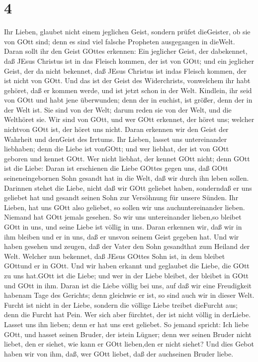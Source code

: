 \hypertarget{section-3}{%
\section{4}\label{section-3}}

 Ihr Lieben, glaubet nicht einem jeglichen Geist, sondern
prüfet dieGeister, ob sie von GOtt sind; denn es sind viel falsche
Propheten ausgegangen in dieWelt.  Daran sollt ihr den Geist
GOttes erkennen: Ein jeglicher Geist, der dabekennet, daß JEsus Christus
ist in das Fleisch kommen, der ist von GOtt;  und ein
jeglicher Geist, der da nicht bekennet, daß JEsus Christus ist indas
Fleisch kommen, der ist nicht von GOtt. Und das ist der Geist des
Widerchrists, vonwelchem ihr habt gehöret, daß er kommen werde, und ist
jetzt schon in der Welt.  Kindlein, ihr seid von GOtt und
habt jene überwunden; denn der in euchist, ist größer, denn der in der
Welt ist.  Sie sind von der Welt; darum reden sie von der
Welt, und die Welthöret sie.  Wir sind von GOtt, und wer
GOtt erkennet, der höret uns; welcher nichtvon GOtt ist, der höret uns
nicht. Daran erkennen wir den Geist der Wahrheit und denGeist des
Irrtums.  Ihr Lieben, lasset uns untereinander liebhaben;
denn die Liebe ist vonGOtt; und wer liebhat, der ist von GOtt geboren
und kennet GOtt.  Wer nicht liebhat, der kennet GOtt nicht;
denn GOtt ist die Liebe:  Daran ist erschienen die Liebe
GOttes gegen uns, daß GOtt seineneingebornen Sohn gesandt hat in die
Welt, daß wir durch ihn leben sollen.  Darinnen stehet die
Liebe, nicht daß wir GOtt geliebet haben, sonderndaß er uns geliebet hat
und gesandt seinen Sohn zur Versöhnung für unsere Sünden. 
Ihr Lieben, hat uns GOtt also geliebet, so sollen wir uns
auchuntereinander lieben.  Niemand hat GOtt jemals gesehen.
So wir uns untereinander lieben,so bleibet GOtt in uns, und seine Liebe
ist völlig in uns.  Daran erkennen wir, daß wir in ihm
bleiben und er in uns, daß er unsvon seinem Geist gegeben hat.
 Und wir haben gesehen und zeugen, daß der Vater den Sohn
gesandthat zum Heiland der Welt.  Welcher nun bekennet, daß
JEsus GOttes Sohn ist, in dem bleibet GOttund er in GOtt. 
Und wir haben erkannt und geglaubet die Liebe, die GOtt zu uns hat.GOtt
ist die Liebe; und wer in der Liebe bleibet, der bleibet in GOtt und
GOtt in ihm.  Daran ist die Liebe völlig bei uns, auf daß
wir eine Freudigkeit habenam Tage des Gerichts; denn gleichwie er ist,
so sind auch wir in dieser Welt.  Furcht ist nicht in der
Liebe, sondern die völlige Liebe treibet dieFurcht aus; denn die Furcht
hat Pein. Wer sich aber fürchtet, der ist nicht völlig in derLiebe.
 Lasset uns ihn lieben; denn er hat uns erst geliebet.
 So jemand spricht: Ich liebe GOtt, und hasset seinen
Bruder, der istein Lügner; denn wer seinen Bruder nicht liebet, den er
siehet, wie kann er GOtt lieben,den er nicht siehet?  Und
dies Gebot haben wir von ihm, daß, wer GOtt liebet, daß der auchseinen
Bruder liebe.

